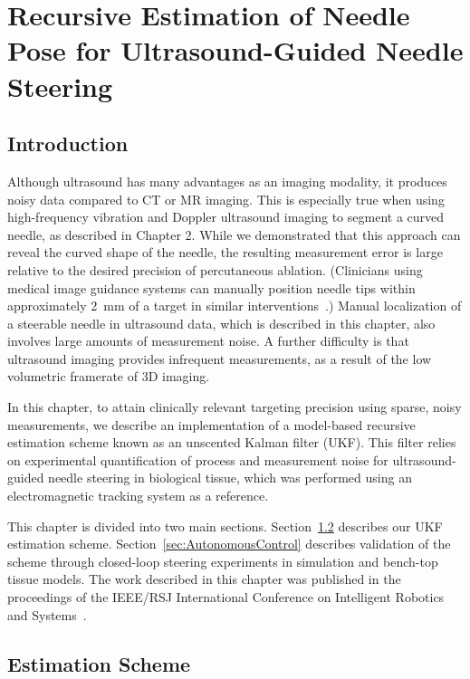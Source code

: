 \chapter[Recursive Estimation of Needle Pose]{Recursive Estimation of Needle Pose for Ultrasound-Guided Needle Steering}

\section{Introduction}
Although ultrasound has many advantages as an imaging modality, it produces noisy data compared to CT or MR imaging. This is especially true when using high-frequency vibration and Doppler ultrasound imaging to segment a curved needle, as described in Chapter 2. While we demonstrated that this approach can reveal the curved shape of the needle, the resulting measurement error is large relative to the desired precision of percutaneous ablation. (Clinicians using medical image guidance systems can manually position needle tips within approximately 2~mm of a target in similar interventions~\cite{Crocetti2008}.) Manual localization of a steerable needle in ultrasound data, which is described in this chapter, also involves large amounts of measurement noise. A further difficulty is that ultrasound imaging provides infrequent measurements, as a result of the low volumetric framerate of 3D imaging. 

In this chapter, to attain clinically relevant targeting precision using sparse, noisy measurements, we describe an implementation of a model-based recursive estimation scheme known as an unscented Kalman filter (UKF). This filter relies on experimental quantification of process and measurement noise for ultrasound-guided needle steering in biological tissue, which was performed using an electromagnetic tracking system as a reference.
 
This chapter is divided into two main sections. Section~\ref{sec:UKF} describes our UKF estimation scheme. Section~\ref{sec:AutonomousControl} describes validation of the scheme through closed-loop steering experiments in simulation and bench-top tissue models. The work described in this chapter was published in the proceedings of the IEEE/RSJ International Conference on Intelligent Robotics and Systems~\cite{Adebar2014a}.

\section{Estimation Scheme}
\label{sec:UKF}
